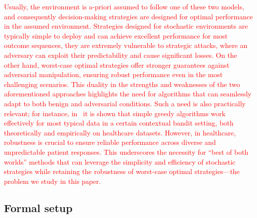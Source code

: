 \textcolor{red}{Usually, the environment is a-priori assumed to follow one of these two models, and consequently decision-making strategies are designed for optimal performance in the assumed environment. Strategies designed for stochastic environments are typically simple to deploy and can achieve excellent performance for most outcome sequences, they are extremely vulnerable to strategic attacks, where an adversary can exploit their predictability and cause significant losses. On the other hand, worst-case optimal strategies offer stronger guarantees against adversarial manipulation, ensuring robust performance even in the most challenging scenarios. This duality in the strengths and weaknesses of the two aforementioned approaches highlights the need for algorithms that can seamlessly adapt to both benign and adversarial conditions. Such a need is also practically relevant; for instance, in~\cite{bastani2021mostly} it is shown that simple greedy algorithms work effectively for most typical data in a certain contextual bandit setting, both theoretically and empirically on healthcare datasets. However, in healthcare, robustness is crucial to ensure reliable performance across diverse and unpredictable patient responses. This underscores the necessity for “best of both worlds” methods that can leverage the simplicity and efficiency of stochastic strategies while retaining the robustness of worst-case optimal strategies---the problem we study in this paper. 
}

\subsection{Formal setup}

